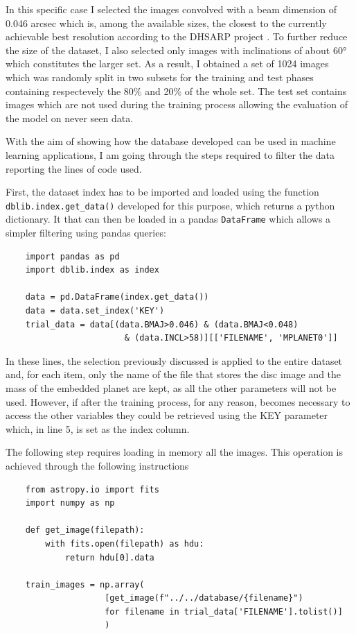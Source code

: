 \documentclass[a4paper,10pt]{report}
\begin{document}
In this specific case I selected the images convolved with a beam dimension of 0.046 arcsec which is,
among the available sizes, the closest to the currently achievable best resolution according to the DHSARP project \citep{dsharp}.
To further reduce the size of the dataset, I also selected only images with inclinations of about
60° which constitutes the larger set.
As a result, I obtained a set of 1024 images which was randomly split in two subsets for the training and
test phases containing respectevely the 80\% and 20\% of the whole set.
The test set contains images which are not used during the training process allowing the evaluation
of the model on never seen data.

With the aim of showing how the database developed can be used in machine learning applications,
I am going through the steps required to filter the data reporting the lines of code used.

First, the dataset index has to be imported and loaded using 
the function \lstinline{dblib.index.get_data()} 
developed for this purpose, which returns
a python dictionary. It that can then be loaded in a pandas \lstinline{DataFrame}
which allows a simpler filtering using pandas queries:

\begin{lstlisting}
    import pandas as pd
    import dblib.index as index

    data = pd.DataFrame(index.get_data())
    data = data.set_index('KEY')
    trial_data = data[(data.BMAJ>0.046) & (data.BMAJ<0.048)
                        & (data.INCL>58)][['FILENAME', 'MPLANET0']]
\end{lstlisting}

In these lines, the selection previously discussed is applied to the entire dataset and,
for each item, only the name of the file that stores the disc image and the mass of the embedded planet are kept, as
all the other parameters will not be used. However, if after the training process, for any reason, becomes necessary
to access the other variables they could be retrieved using the KEY parameter which, in line 5, is set as 
the index column.

The following step requires loading in memory all the images. This operation is achieved through the following
instructions

\begin{lstlisting}
    from astropy.io import fits
    import numpy as np

    def get_image(filepath):
        with fits.open(filepath) as hdu:
            return hdu[0].data
    
    train_images = np.array(
                    [get_image(f"../../database/{filename}") 
                    for filename in trial_data['FILENAME'].tolist()]
                    )
\end{lstlisting}
\end{document}
